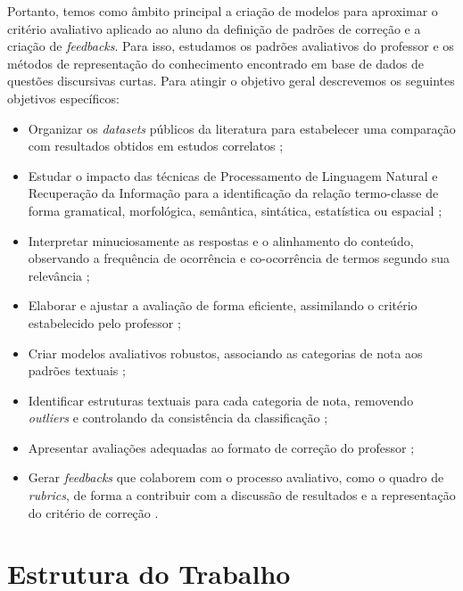 Portanto, temos como âmbito principal a criação de modelos para aproximar o critério avaliativo aplicado ao aluno da definição de padrões de correção e a criação de \textit{feedbacks}. Para isso, estudamos os padrões avaliativos do professor e os métodos de representação do conhecimento encontrado em base de dados de questões discursivas curtas. Para atingir o objetivo geral descrevemos os seguintes objetivos específicos:

\begin{itemize}
\item Organizar os \textit{datasets} públicos da literatura para estabelecer uma comparação com resultados obtidos em estudos correlatos \cite{burrows2015};
\item Estudar o impacto das técnicas de Processamento de Linguagem Natural e Recuperação da Informação para a identificação da relação termo-classe de forma gramatical, morfológica, semântica, sintática, estatística ou espacial \cite{galhardi2018a, kumar2019, sahu2020};
\item Interpretar minuciosamente as respostas e o alinhamento do conteúdo, observando a frequência de ocorrência e co-ocorrência de termos segundo sua relevância \cite{jordan2012, saha2018, ding2020};
\item Elaborar e ajustar a avaliação de forma eficiente, assimilando o critério estabelecido pelo professor \cite{zesch2015, condor2020, pado2021};
\item Criar modelos avaliativos robustos, associando as categorias de nota aos padrões textuais \cite{butcher2010, heilman2015, burrows2015};
\item Identificar estruturas textuais para cada categoria de nota, removendo \textit{outliers} e controlando da consistência da classificação \cite{ding2020, filighera2020};
\item Apresentar avaliações adequadas ao formato de correção do professor \cite{higgins2014, funayama2020, pado2021};
\item Gerar \textit{feedbacks} que colaborem com o processo avaliativo, como o quadro de \textit{rubrics}, de forma a contribuir com a discussão de resultados e a representação do critério de correção \cite{marvaniya2018, mizumoto2019, suzen2020}.
\end{itemize}

\section{Estrutura do Trabalho}

